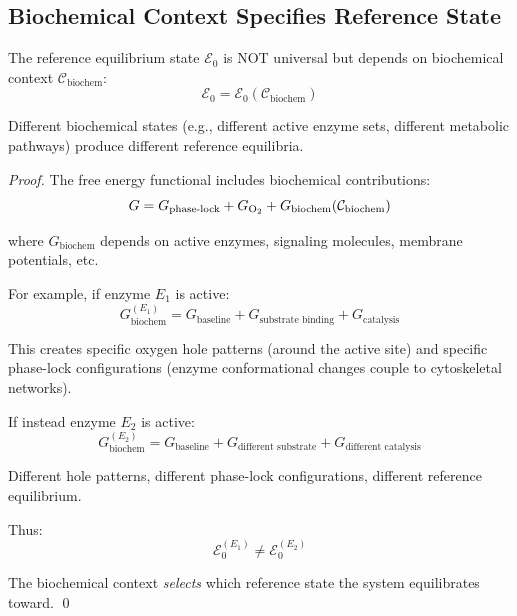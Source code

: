 \subsection{Biochemical Context Specifies Reference State}

\begin{theorem}
\label{thm:context_equilibrium}
The reference equilibrium state $\mathcal{E}_0$ is NOT universal but depends on biochemical context $\mathcal{C}_{\text{biochem}}$:
\begin{equation}
\mathcal{E}_0 = \mathcal{E}_0(\mathcal{C}_{\text{biochem}})
\end{equation}

Different biochemical states (e.g., different active enzyme sets, different metabolic pathways) produce different reference equilibria.
\end{theorem}

\begin{proof}
The free energy functional includes biochemical contributions:
\begin{equation}
G = G_{\text{phase-lock}} + G_{\ce{O2}} + G_{\text{biochem}}(\mathcal{C}_{\text{biochem}})
\end{equation}

where $G_{\text{biochem}}$ depends on active enzymes, signaling molecules, membrane potentials, etc.

For example, if enzyme $E_1$ is active:
\begin{equation}
G_{\text{biochem}}^{(E_1)} = G_{\text{baseline}} + G_{\text{substrate binding}} + G_{\text{catalysis}}
\end{equation}

This creates specific oxygen hole patterns (around the active site) and specific phase-lock configurations (enzyme conformational changes couple to cytoskeletal networks).

If instead enzyme $E_2$ is active:
\begin{equation}
G_{\text{biochem}}^{(E_2)} = G_{\text{baseline}} + G_{\text{different substrate}} + G_{\text{different catalysis}}
\end{equation}

Different hole patterns, different phase-lock configurations, different reference equilibrium.

Thus:
\begin{equation}
\mathcal{E}_0^{(E_1)} \neq \mathcal{E}_0^{(E_2)}
\end{equation}

The biochemical context \textit{selects} which reference state the system equilibrates toward. \qed
\end{proof}


